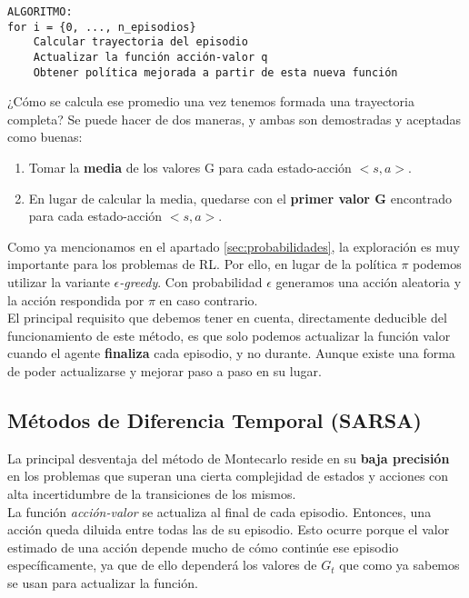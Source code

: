 \documentclass[11pt,fleqn]{book} %
\begin{document}
\begin{verbatim}
ALGORITMO:
for i = {0, ..., n_episodios}
    Calcular trayectoria del episodio
    Actualizar la función acción-valor q
    Obtener política mejorada a partir de esta nueva función
\end{verbatim}

¿Cómo se calcula ese promedio una vez tenemos formada una trayectoria completa? Se puede hacer de dos maneras, y ambas son demostradas y aceptadas como buenas: \\

\begin{enumerate}
	\item Tomar la \textbf{media} de los valores G para cada estado-acción $<s,a>$. \\
	
	\item En lugar de calcular la media, quedarse con el \textbf{primer valor G} encontrado para cada estado-acción $<s,a>$. \\
\end{enumerate}

Como ya mencionamos en el apartado \ref{sec:probabilidades}, la exploración es muy importante para los problemas de RL. Por ello, en lugar de la política $\pi$ podemos utilizar la variante \textit{$\epsilon$-greedy}. Con probabilidad $\epsilon$ generamos una acción aleatoria y la acción respondida por $\pi$ en caso contrario. \\

El principal requisito que debemos tener en cuenta, directamente deducible del funcionamiento de este método, es que solo podemos actualizar la función valor cuando el agente \textbf{finaliza} cada episodio, y no durante. Aunque existe una forma de poder actualizarse y mejorar paso a paso en su lugar.

\subsection{Métodos de Diferencia Temporal (SARSA)}\label{sec:sarsa}

La principal desventaja del método de Montecarlo reside en su \textbf{baja precisión} en los problemas que superan una cierta complejidad de estados y acciones con alta incertidumbre de la transiciones de los mismos.\\

La función \textit{acción-valor} se actualiza al final de cada episodio. Entonces, una acción queda diluida entre todas las de su episodio. Esto ocurre porque el valor estimado de una acción depende mucho de cómo continúe ese episodio específicamente, ya que de ello dependerá los valores de $G_t$ que como ya sabemos se usan para actualizar la función. \\
\end{document}
